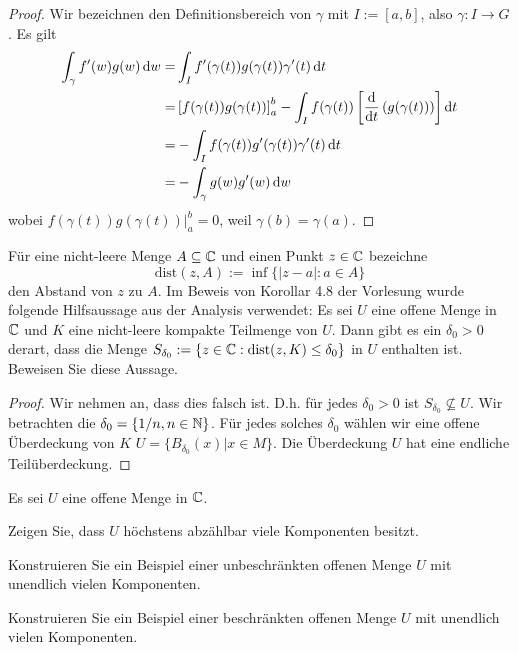 \begin{proof}
	Wir bezeichnen den Definitionsbereich von $\gamma$ mit $I:=[a,b]$, also $\gamma:I\to G$. Es gilt
	\begin{align*}
		\int_\gamma f'(w)g(w)\dd{w}=&\int_I f'(\gamma(t))g(\gamma(t))\gamma'(t)\dd{t}\\
		=&\left[ f(\gamma(t))g(\gamma(t)) \right]_a^b-\int_I f(\gamma(t))\left[\dv{t}\left( g(\gamma(t)) \right)\right]\dd{t}\\
		=&-\int_I f(\gamma(t))g'(\gamma(t))\gamma'(t)\dd{t}\\
		=&-\int_\gamma g(w)g'(w)\dd{w}
	\end{align*}
	wobei $\left. f(\gamma(t))g(\gamma(t))\right|_a^b=0$, weil $\gamma(b)=\gamma(a)$.
\end{proof}
\begin{Problem}
Für eine nicht-leere Menge $A\subseteq \mathbb{C}$ und einen Punkt $z\in \mathbb{C}$ bezeichne
\[
\text{dist}(z,A):=\inf \{|z-a|:a\in A\} 
\]
den Abstand von $z$ zu $A$. Im Beweis von Korollar 4.8 der Vorlesung wurde folgende Hilfsaussage aus der Analysis verwendet: Es sei $U$ eine offene Menge in $\mathbb{C}$ und $K$ eine nicht-leere kompakte Teilmenge von $U$. Dann gibt es ein $\delta_0>0$ derart, dass die Menge $S_{\delta_0}:=\{z\in \mathbb{C}:\text{dist}(z,K)\le \delta_0\} $ in $U$ enthalten ist. Beweisen Sie diese Aussage. 
\end{Problem}
\begin{proof}
	Wir nehmen an, dass dies falsch ist. D.h. für jedes $\delta_0>0$ ist $S_{\delta_0}\not\subseteq U$. Wir betrachten die $\delta_0=\{1 / n,n\in \mathbb{N}\} $. Für jedes solches $\delta_0$ wählen wir eine offene Überdeckung von $K$ $U=\{B_{\delta_0}(x)|x\in M\} $. Die Überdeckung $U$ hat eine endliche Teilüberdeckung.
\end{proof}
\begin{Problem}
	Es sei $U$ eine offene Menge in $\mathbb{C}$.
	\begin{parts}
	\item Zeigen Sie, dass $U$ höchstens abzählbar viele Komponenten besitzt.
	\item  Konstruieren Sie ein Beispiel einer unbeschränkten offenen Menge $U$ mit unendlich vielen Komponenten.
	\item Konstruieren Sie ein Beispiel einer beschränkten offenen Menge $U$ mit unendlich vielen Komponenten. 
	\end{parts}
\end{Problem}
